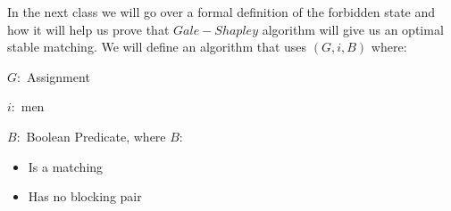 \documentclass[twoside]{article}
\begin{document}
\vspace*{1cm}In the next class we will go over a formal definition of the forbidden state and how it will help us prove that $Gale-Shapley$ algorithm will give us an optimal stable matching. We will define an algorithm that uses $(G, i, B)$ where:

$G:$ Assignment

$i:$ men

$B:$ Boolean Predicate, where $B$: 
\begin{itemize}
\item Is a matching 
\item Has no blocking pair
\end{itemize}
\end{document}
